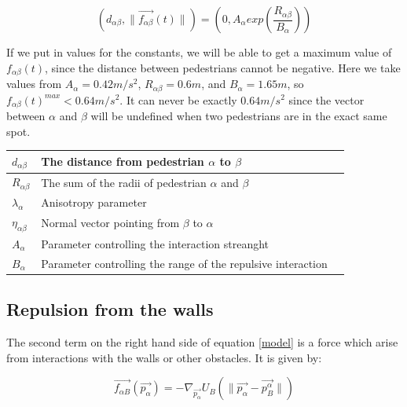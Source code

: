 \begin{equation}
	\left( d_{\alpha \beta} , \| \overrightarrow{f_{\alpha \beta}} \left( t \right) \| \right)
 =
	\left( 0 , A_{\alpha} exp\left( \frac{R_{\alpha\beta} }{B_{\alpha}}\right)  \right) 
\end{equation}

If we put in values for the constants, we will be able to get a maximum value of $ f_{\alpha\beta}(t) $, 
since the distance between pedestrians cannot be negative. Here we take values from \cite{ABconstant} $ A_{\alpha} = 0.42 m/s^{2} $, 
$ R_{\alpha\beta} = 0.6 m $, and $ B_{\alpha} = 1.65 m $, so 
$ f_{\alpha\beta}(t)^{max} < 0.64 m/s^{2} $. It can never be exactly $0.64m/s^2$ since the vector between $\alpha$ and $\beta$ will be undefined when two pedestrians are in the exact same spot.


\begin{center}
\begin{tabular}{lll}
\hline
$d_{\alpha \beta}$& The distance from pedestrian $\alpha$ to $\beta$ &\\
\hline
$R_{\alpha\beta}$& The sum of the radii of pedestrian $\alpha$ and $\beta$ \\
\hline
$\lambda_{\alpha}$& Anisotropy parameter &\\
\hline
$\eta_{\alpha \beta}$& Normal vector pointing from $\beta$ to $\alpha$ \\
\hline
$A_{\alpha}$& Parameter controlling the interaction streanght \\
\hline
$B_{\alpha}$& Parameter controlling the range of the repulsive interaction  \\
\hline
\end{tabular}
\end{center}

\subsection{Repulsion from the walls}
The second term on the right hand side of equation \eqref{model} is a force which 
arise from interactions with the walls or other obstacles. It is given by:

\begin{equation}\label{wallpotential}
    \overrightarrow{f_{\alpha B}} \left( \overrightarrow{p_{\alpha}} \right) =
    - \nabla_{\overrightarrow{p_{\alpha}}} U_{B}
    \left( \| \overrightarrow{p_{\alpha}} - \overrightarrow{p_{B}^{\alpha}} \| \right)
\end{equation}

